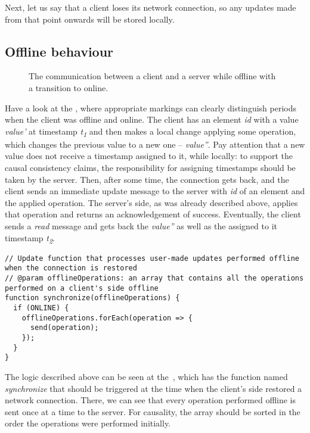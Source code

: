 Next, let us say that a client loses its network connection, so any updates made from that point onwards will be stored locally.  

\subsection*{Offline behaviour}

\begin{figure}[!htb]
    \begin{center}
    \def\svgwidth{\linewidth}
    
    \caption {The communication between a client and a server while offline with a transition to online.}
    \label{fig:design4}
\end{center}
\end{figure}

Have a look at the , where appropriate markings can clearly distinguish periods when the client was offline and online. The client has an element \textit{id} with a value \textit{value'} at timestamp \textit{t\textsubscript{1}} and then makes a local change applying some operation, which changes the previous value to a new one -- \textit{value''}. Pay attention that a new value does not receive a timestamp assigned to it, while locally: to support the causal consistency claims, the responsibility for assigning timestamps should be taken by the server. Then, after some time, the connection gets back, and the client sends an immediate update message to the server with \textit{id} of an element and the applied operation. The server's side, as was already described above, applies that operation and returns an acknowledgement of success. Eventually, the client sends a \textit{read} message and gets back the \textit{value''} as well as the assigned to it timestamp \textit{t\textsubscript{2}}.

\begin{lstlisting}[caption={A pseudocode for sending offline performed operations to the server.}, label={lst:offline}]
// Update function that processes user-made updates performed offline when the connection is restored
// @param offlineOperations: an array that contains all the operations performed on a client's side offline
function synchronize(offlineOperations) {
  if (ONLINE) {
    offlineOperations.forEach(operation => {
      send(operation);
    });
  }
}
\end{lstlisting} 

The logic described above can be seen at the~, which has the function named \textit{synchronize} that should be triggered at the time when the client's side restored a network connection. There, we can see that every operation performed offline is sent once at a time to the server. For causality, the array should be sorted in the order the operations were performed initially.

